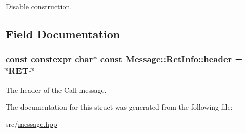 Disable construction. 



\subsection{Field Documentation}
\subsubsection[{\texorpdfstring{header}{header}}]{\setlength{\rightskip}{0pt plus 5cm}const constexpr char$\ast$ const Message\+::\+Ret\+Info\+::header = \char`\"{}R\+ET-\/\char`\"{}\hspace{0.3cm}{\ttfamily [static]}}\hypertarget{struct_message_1_1_ret_info_a15d17cb758011b5e1b787a416ec8c32a}{}\label{struct_message_1_1_ret_info_a15d17cb758011b5e1b787a416ec8c32a}


The header of the Call message. 



The documentation for this struct was generated from the following file\+:\begin{DoxyCompactItemize}
\item 
src/\hyperlink{message_8hpp}{message.\+hpp}\end{DoxyCompactItemize}
